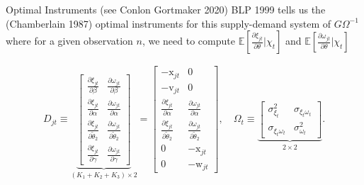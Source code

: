 \documentclass[xcolor=pdftex,dvipsnames,table,mathserif,aspectratio=169]{beamer}
\begin{document}
\begin{frame}{Optimal Instruments (see Conlon Gortmaker 2020)}
\noindent BLP 1999 tells us the (Chamberlain 1987) optimal instruments for this supply-demand system of $G\Omega^{-1}$ where for a given observation $n$, we need to compute $\mathbb{E}[\frac{\partial \xi_{jt}}{\partial \theta} | \chi_t]$ and $\mathbb{E}[\frac{\partial \omega_{jt}}{\partial \theta} | \chi_t]$

\begin{align*}
    D_{jt} \equiv \underbrace{
        \begin{bmatrix}
            \frac{\partial \xi_{jt}}{\partial \beta}
            & \frac{\partial \omega_{jt}}{\partial \beta} \\
            \frac{\partial \xi_{jt}}{\partial \alpha}
            & \frac{\partial \omega_{jt}}{\partial \alpha} \\
            \frac{\partial \xi_{jt}}{\partial \widetilde{\theta}_2}
            & \frac{\partial \omega_{jt}}{\partial \widetilde{\theta}_2} \\
            \frac{\partial \xi_{jt}}{\partial \gamma} 
            & \frac{\partial \omega_{jt}}{\partial \gamma} 
        \end{bmatrix}
    }_{(K_1 + K_2 + K_3)\times 2}
    = 
    \begin{bmatrix}
        -\mathrm{x}_{jt} & 0 \\
        -\mathrm{v}_{jt} & 0 \\
        \frac{\partial \xi_{jt}}{\partial \alpha}  
        &  \frac{\partial \omega_{jt}}{\partial \alpha}\\
        \frac{\partial \xi_{jt}}{\partial \widetilde{\theta}_2} 
        & \frac{\partial \omega_{jt}}{\partial \widetilde{\theta}_2} \\
        0 & -\mathrm{x}_{jt} \\
        0 & -\mathrm{w}_{jt}
    \end{bmatrix}
    , \quad \Omega_t \equiv 
    \underbrace{
        \begin{bmatrix}
        \sigma^2_{\xi_t} & \sigma_{\xi_t \omega_t}\\
        \sigma_{\xi_t \omega_t} & \sigma^2_{\omega_t}
    \end{bmatrix}
    }_{2 \times 2}.
\end{align*}
\end{frame}
\end{document}
